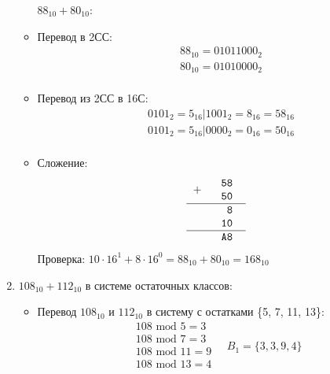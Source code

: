 \documentclass[oneside,a4paper,14pt]{extarticle} %
\begin{document}
\begin{enumerate}
\begin{itemize}
                $88_{10} + 80_{10}$:
                \item Перевод в 2СС:
                $$
                    \begin{array}{cc}
                        & 88_{10} = 01011000_{2}\\
                        & 80_{10} = 01010000_{2}\\
                    \end{array}
                $$
                \item Перевод из 2СС в 16С:
                    $$
                        \begin{array}{cc}
                            & 0101_{2} = 5_{16} | 1001_{2} = 8_{16} = 58_{16}\\
                            & 0101_{2} = 5_{16} | 0000_{2} = 0_{16} = 50_{16}\\
                        \end{array}
                    $$
                \item Сложение:
                    $$    
                        \begin{tabular}{{c}{c}}
                        \texttt{$+$ }&
                        \begin{tabular}{c}
                        \texttt{58}\\
                        \texttt{50}\\
                        \end{tabular} \\ 
                        \hline
                        & \texttt{~8}\\
                        & \texttt{10}\\
                        \hline
                        & \texttt{A8} \\
                        \end{tabular}
                    $$
                Проверка: $10 \cdot 16^1 + 8 \cdot 16^0 = 88_{10} + 80_{10} = 168_{10}$
            \end{itemize}
        \item $108_{10} + 112_{10}$ в системе остаточных классов:
            \begin{itemize}
                \item Перевод $108_{10}$ и $112_{10}$ в систему с остатками \{5, 7, 11, 13\}:
                    $$
                        \begin{array}{lr}
                            108 \textrm{ mod } 5 = 3 \\
                            108 \textrm{ mod } 7 = 3 \\
                            108 \textrm{ mod } 11 = 9 \\
                            108 \textrm{ mod } 13 = 4 \\
                        \end{array}
                        \quad B_{1} = \{3, 3, 9, 4\}
                    $$


\end{itemize}
\end{enumerate}
\end{document}
